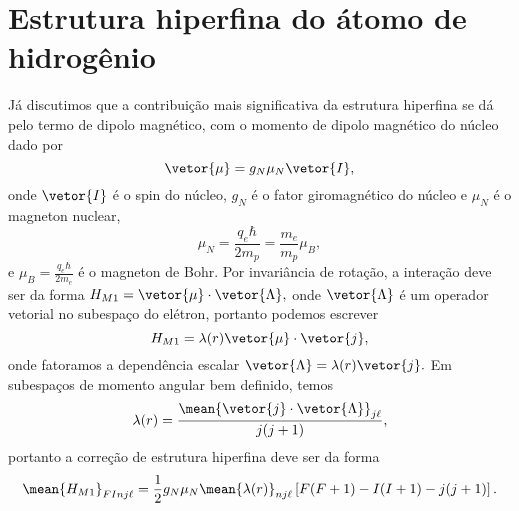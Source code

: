 \section{Estrutura hiperfina do átomo de hidrogênio}
Já discutimos que a contribuição mais significativa da estrutura hiperfina se dá pelo termo de dipolo magnético, com o momento de dipolo magnético do núcleo dado por
\begin{equation*}
   \vetor{\mu} = g_N \mu_N \vetor{I},
\end{equation*}
onde \(\vetor{I}\) é o spin do núcleo, \(g_N\) é o fator giromagnético do núcleo e \(\mu_N\) é o magneton nuclear,
\begin{equation*}
   \mu_N = \frac{q_e \hbar}{2m_p} = \frac{m_e}{m_p}\mu_B,
\end{equation*}
e \(\mu_B = \frac{q_e \hbar}{2m_e}\) é o magneton de Bohr. Por invariância de rotação, a interação deve ser da forma \(H_{M1} = \vetor{\mu} \cdot \vetor{\Lambda},\) onde \(\vetor{\Lambda}\) é um operador vetorial no subespaço do elétron, portanto podemos escrever
\begin{equation*}
   H_{M1} = \lambda(r) \vetor{\mu} \cdot \vetor{j},
\end{equation*}
onde fatoramos a dependência escalar \(\vetor{\Lambda} = \lambda(r)\vetor{j}.\) Em subespaços de momento angular bem definido, temos
\begin{equation*}
   \lambda(r) = \frac{\mean{\vetor{j} \cdot \vetor{\Lambda}}_{j\ell}}{j (j + 1)},
\end{equation*}
portanto a correção de estrutura hiperfina deve ser da forma
\begin{equation*}
   \mean{H_{M1}}_{FInj\ell} = \frac12 g_N \mu_N \mean{\lambda(r)}_{nj\ell} \left[F(F+1) - I(I + 1) - j(j+1)\right].
\end{equation*}


